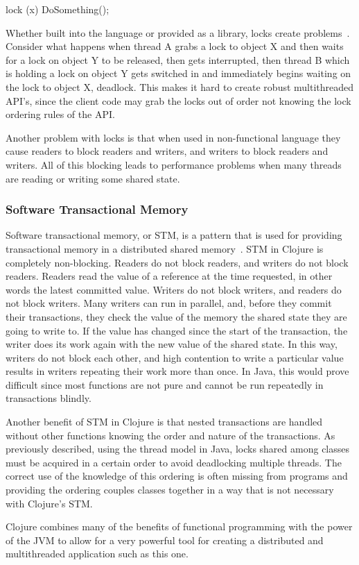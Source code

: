 lock (x)
{
    DoSomething();
}

Whether built into the language or provided as a library, locks create problems~\cite{problemsWithThreads}.
Consider what happens when thread A grabs a lock to object X and then waits for
a lock on object Y to be released, then gets interrupted, then thread B which is holding a lock
on object Y gets switched in and immediately begins waiting on the lock to object X, deadlock.
This makes it hard to create robust multithreaded API's, since the client code may grab the locks out of order not
knowing the lock ordering rules of the API. 

Another problem with locks is that when used in non-functional language they cause 
readers to block readers and writers, and writers to block readers and writers. All of this blocking leads to performance problems
when many threads are reading or writing some shared state.

\subsubsection{Software Transactional Memory}
Software transactional memory, or STM, is a pattern that is used for
providing transactional memory in a distributed shared
memory~\cite{stm}. 
STM in Clojure is completely non-blocking. 
Readers do not block readers, and writers do not block readers. 
Readers read the value of a reference at the time requested, in other
words the latest committed value. 
Writers do not block writers, and readers do not block writers. 
Many writers can run in parallel, and, before they commit their
transactions, they check the value of the memory the shared state they
are going to write to. 
If the value has changed since the start of the transaction, the
writer does its work again with the new value of the shared state. 
In this way, writers do not block each other, and high contention to
write a particular value results in writers repeating their work more
than once. 
In Java, this would prove difficult since most functions are not pure and cannot be run repeatedly in transactions blindly. 

Another benefit of STM in Clojure is that nested transactions are handled without other functions knowing the order and nature of the transactions. As previously described, using the thread model in Java, locks shared among classes must be acquired in a certain order to avoid deadlocking multiple threads. The correct use of the knowledge of this ordering is often missing from programs and providing the ordering couples classes together in a way that is not necessary with Clojure's STM.  

Clojure combines many of the benefits of functional programming with the power of the JVM to allow for a very powerful tool for creating a distributed and multithreaded application such as this one.  





